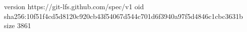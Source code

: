 version https://git-lfs.github.com/spec/v1
oid sha256:10f51f4cd5d8120c920cb43f54067d544c701d6f3940a97f5d4846c1cbc3631b
size 3861
